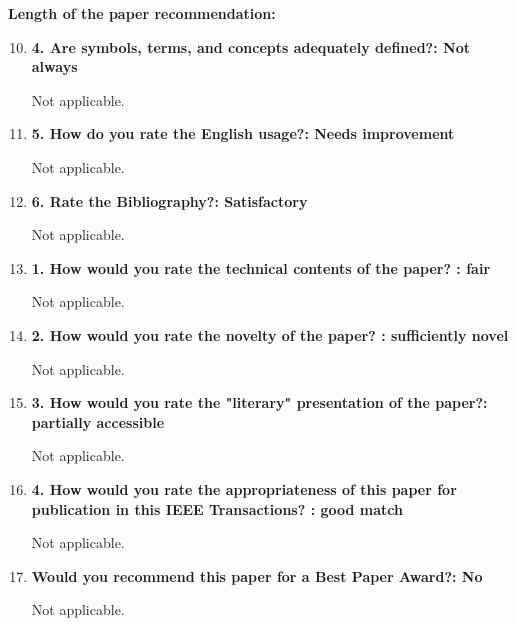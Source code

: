\documentclass[12pt]{article}
\begin{document}
\textbf{Length of the paper recommendation:}

\begin{enumerate}
\setcounter{enumi}{9}

\item  \textbf{4. Are symbols, terms, and concepts adequately defined?: Not always}

Not applicable.

\item \textbf{5. How do you rate the English usage?: Needs improvement}

Not applicable.

\item \textbf{6. Rate the Bibliography?: Satisfactory}

Not applicable.

\item \textbf{1. How would you rate the technical contents of the paper? : fair}

Not applicable.

\item \textbf{2. How would you rate the novelty of the paper? : sufficiently novel}

Not applicable.

\item \textbf{3. How would you rate the "literary" presentation of the paper?: partially 
accessible}

Not applicable.

\item  \textbf{4. How would you rate the appropriateness of this paper for publication in 
this IEEE Transactions? : good match}

Not applicable.

\item \textbf{Would you recommend this paper for a Best Paper Award?: No}

Not applicable.

\end{enumerate}
\end{document}
